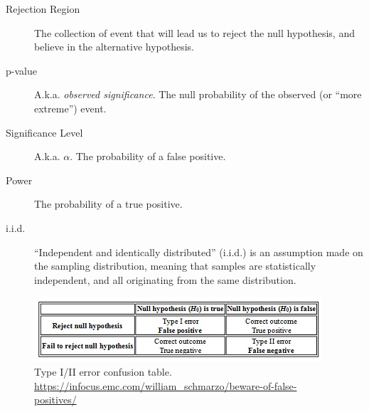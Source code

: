 \begin{description}
\item [Rejection Region] The collection of event that will lead us to reject the null hypothesis, and believe in the alternative hypothesis.
\item [p-value] A.k.a. \emph{observed significance}. The null probability of the observed (or ``more extreme'') event.
\item [Significance Level] A.k.a. $\alpha$. The probability of a false positive.
\item [Power] The probability of a true positive.
\item [i.i.d.] ``Independent and identically distributed'' (i.i.d.) is an assumption made on the sampling distribution, meaning that samples are statistically independent, and all originating from the same distribution.

\end{description}

\begin{figure}
\centering
\includegraphics[width=0.8\linewidth]{art/Beware-of-False-Positives-Chart-1}
\caption[Confusion Table]{Type I/II error confusion table. \newline \url{https://infocus.emc.com/william_schmarzo/beware-of-false-positives/}}
\label{fig:confusion_table}
\end{figure}


